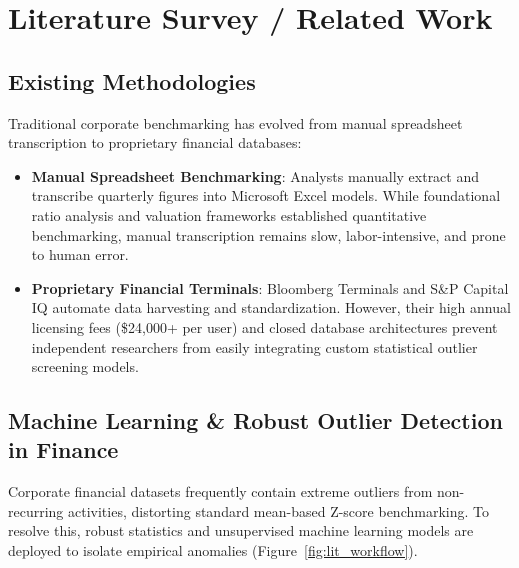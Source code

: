 \chapter{Literature Survey / Related Work}
\label{ch:lit}

\section{Existing Methodologies}
Traditional corporate benchmarking has evolved from manual spreadsheet transcription to proprietary financial databases:
\begin{itemize}
    \setlength{\itemsep}{1.5pt}
    \setlength{\parskip}{0pt}
    \setlength{\parsep}{0pt}
    \item \textbf{Manual Spreadsheet Benchmarking}: Analysts manually extract and transcribe quarterly figures into Microsoft Excel models. While foundational ratio analysis \cite{altman1968financial} and valuation frameworks \cite{damodaran2012investment} established quantitative benchmarking, manual transcription remains slow, labor-intensive, and prone to human error.
    \item \textbf{Proprietary Financial Terminals}: Bloomberg Terminals and S\&P Capital IQ automate data harvesting and standardization. However, their high annual licensing fees (\$24,000+ per user) and closed database architectures prevent independent researchers from easily integrating custom statistical outlier screening models.
\end{itemize}

\section{Machine Learning \& Robust Outlier Detection in Finance}
Corporate financial datasets frequently contain extreme outliers from non-recurring activities, distorting standard mean-based Z-score benchmarking. To resolve this, robust statistics and unsupervised machine learning models are deployed to isolate empirical anomalies (Figure~\ref{fig:lit_workflow}).

